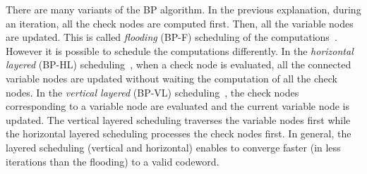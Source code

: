 There are many variants of the BP algorithm. In the previous explanation, during
an iteration, all the check nodes are computed first. Then, all the variable
nodes are updated. This is called \emph{flooding} (BP-F) scheduling of the
computations~\cite{MacKay1995}. However it is possible to schedule the
computations differently. In the \emph{horizontal layered} (BP-HL)
scheduling~\cite{Yeo2001}, when a check node is evaluated, all the connected
variable nodes are updated without waiting the computation of all the check
nodes. In the \emph{vertical layered} (BP-VL) scheduling~\cite{Zhang2002}, the
check nodes corresponding to a variable node are evaluated and the current
variable node is updated. The vertical layered scheduling traverses the variable
nodes first while the horizontal layered scheduling processes the check nodes
first. In general, the layered scheduling (vertical and horizontal) enables to
converge faster (in less iterations than the flooding) to a valid codeword.




